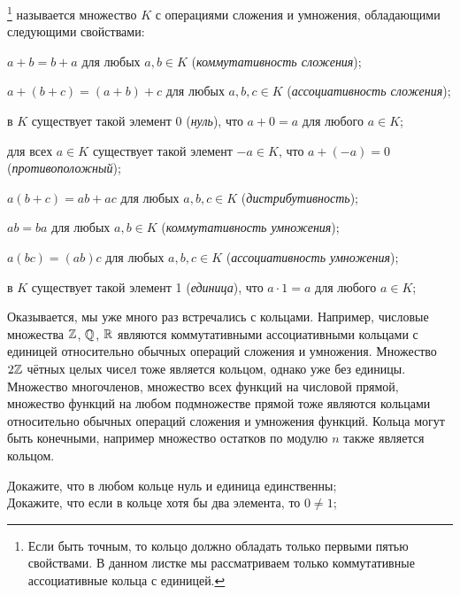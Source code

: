 \documentclass[a4paper,12pt]{article}
\begin{document}
\normalsize
{}
%
\footnote{Если быть точным, то кольцо должно обладать только первыми пятью свойствами. 
В данном листке мы рассматриваем только коммутативные ассоциативные кольца с единицей.} 
называется множество $K$ с операциями сложения и умножения, обладающими следующими свойствами:
\vspace*{-1mm}
\begin{nums}{-5}
\item $a+b=b+a$ для любых $a,b\in K$ (\emph{коммутативность сложения\/});
\item $a+(b+c)=(a+b)+c$ для любых $a,b,c\in K$ (\emph{ассоциативность сложения\/});
\item в $K$ существует такой элемент 0 (\emph{нуль\/}), что $a+0=a$ для любого $a\in K$;
\item для всех $a\in K$ существует такой элемент $-a\in K$, что $a+(-a)=0$ (\emph{противоположный\/});
\item $a(b+c)=ab+ac$  для любых $a,b,c\in K$ (\emph{дистрибутивность\/});
\item $ab=ba$ для любых $a,b\in K$ (\emph{коммутативность умножения\/});
\item $a(bc)=(ab)c$ для любых $a,b,c\in K$ (\emph{ассоциативность умножения\/});
\item в $K$ существует такой элемент 1 (\emph{единица\/}), что $a\cdot1=a$ для любого $a\in K$;
\end{nums}
\vspace*{-3mm}

\small
Оказывается, мы уже много раз встречались с кольцами.
Например, числовые множества $\mathbb{Z}$, $\mathbb{Q}$, $\mathbb{R}$ являются коммутативными ассоциативными кольцами с единицей относительно
обычных операций сложения и умножения. Множество $2\mathbb{Z}$ чётных целых чисел тоже является кольцом, однако уже без единицы.
Множество многочленов, множество всех функций на числовой прямой, множество функций на любом подмножестве прямой тоже являются кольцами относительно обычных операций сложения и умножения функций.
Кольца могут быть конечными, например множество остатков по модулю $n$ также является кольцом.

\normalsize

Докажите, что в любом кольце нуль и единица единственны;
\\
Докажите, что если в кольце хотя бы два элемента, то $0\ne1$;
\end{document}

